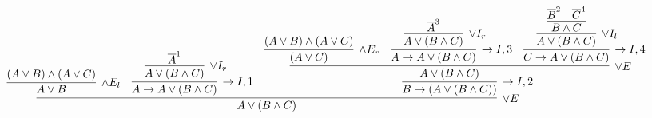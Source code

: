 \documentclass[11pt]{report}
\newcommand{\temp}[2]{{\overline{#2}}^{#1}}
\begin{document}
\begin{enumerate}
\begin{enumerate}
		\newpage
		\begin{sidewaysfigure}
		\begin{center}
			$\begin{array}{c}
				\infer[\lor E]{A \lor (B \land C)}
					{\infer[\land E_{l}]{A \lor B}
						{(A \lor B) \land (A \lor C)}
					&
					\infer[\to I,1]{A \to A \lor (B \land C)}
						{\infer[\lor I_{r}]{A \lor (B \land C)}
							{\temp{1}{A}}}
					&
					\infer[\to I, 2]{B \to (A \lor (B \land C))}
						{\infer[\lor E]{A \lor (B \land C)}
							{\infer[\land E_{r}]{(A \lor C)}
								{(A \lor B) \land (A \lor C)}
							&
							\infer[\to I,3]{A \to A \lor (B \land C)}
								{\infer[\lor I_{r}]{A \lor (B \land C)}
									{\temp{3}{A}}}
							&
							\infer[\to I, 4]{C \to A \lor (B \land C)}
								{\infer[\lor I_{l}]{A \lor (B \land C)}
									{\infer[]{B \land C}
										{\temp{2}{B}&\temp{4}{C}}}}}}}
			\end{array}$
		\end{center}
	\end{sidewaysfigure}





	\end{enumerate}



\end{enumerate}	
\end{document}
